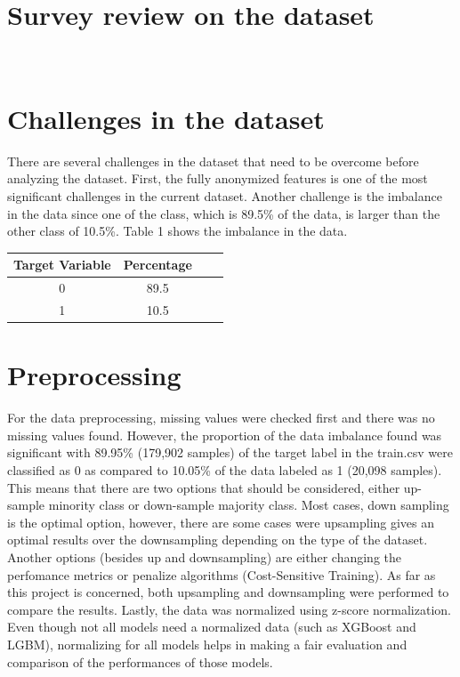 \documentclass[journal,twoside,web]{ieeecolor}
\begin{document}
\section{Survey review on the dataset}

\\

\section{Challenges in the dataset}

There are several challenges in the dataset that need to be overcome before analyzing the dataset. First, the fully anonymized  features is one of the most significant challenges in the current dataset.  Another challenge is the imbalance in the data since one of the class, which is 89.5\% of the data, is larger than the other class of 10.5\%.
Table 1 shows the imbalance in the data.

\begin{center}
 \begin{tabular}{||c c c c||} 
 \hline
 Target Variable & Percentage \\ [0.5ex] 
 \hline\hline
 0 & 89.5  \\ 
 \hline
 1 & 10.5 \\[1ex]
 \hline
\end{tabular}
\end{center}







\section{Preprocessing}
For the data preprocessing, missing values were checked first and there was no missing values found. However, the proportion of the data imbalance found was significant with 89.95\% (179,902 samples) of the target label in the train.csv were classified as 0 as compared to 10.05\% of the data labeled as 1 (20,098 samples). This means that there are two options that should be considered, either up-sample minority class or down-sample majority class. Most cases, down sampling is the optimal option, however, there are some cases were upsampling gives an optimal results over the downsampling depending on the type of the dataset. Another options (besides up and downsampling) are either changing the perfomance metrics or penalize algorithms (Cost-Sensitive Training). As far as this project is concerned, both upsampling and downsampling were performed to compare the results. Lastly, the data was normalized using z-score normalization. Even though not all models need a normalized data (such as XGBoost and LGBM), normalizing for all models helps in making a fair evaluation and comparison of the performances of those models. 
\end{document}
